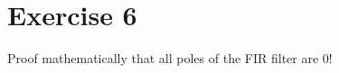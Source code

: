 %
%
%

{}
\section*{Exercise 6}


\begin{question}[subtitle={Decibel}]
	Proof mathematically that all poles of the FIR filter are $0$!
	
	\begin{tasks}
	\end{tasks}
\end{question}

\begin{solution}
	\begin{tasks}
	\end{tasks}
\end{solution}


%
